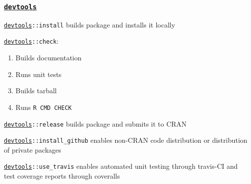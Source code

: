 \documentclass[12 pt]{beamer}\usepackage[]{graphicx}\usepackage[]{color}
\newcommand{\hlkwd}[1]{\textcolor[rgb]{0.78,0.227,0.412}{#1}}%
\newcommand{\mxkwd}[1]{\texttt{\hlkwd{#1}}}%
\newcommand{\pkg}[1]{{\fontseries{b}\selectfont #1}}
\renewcommand{\pkg}[1]{{\color{darkgreen}\texttt{#1}}}
\begin{document}

  \begin{frame}[fragile]
\frametitle{\href{http://cran.r-project.org/web/packages/devtools/index.html}{\pkg{devtools}}}

\href{http://cran.r-project.org/web/packages/devtools/index.html}{\pkg{devtools}}{\tt ::\mxkwd{install}} builds package and installs it locally

\vspace{.1in}

\href{http://cran.r-project.org/web/packages/devtools/index.html}{\pkg{devtools}}{\tt ::\mxkwd{check}}:
\begin{enumerate}
  \item  Builds documentation
  \item Runs unit tests
  \item Builds tarball
  \item Runs {\tt R CMD CHECK}
\end{enumerate}

\vspace{.1in}

\href{http://cran.r-project.org/web/packages/devtools/index.html}{\pkg{devtools}}{\tt ::\mxkwd{release}} builds package and submits it to CRAN

\vspace{.1in}

\href{http://cran.r-project.org/web/packages/devtools/index.html}{\pkg{devtools}}{\tt ::\mxkwd{install\_github}} enables non-CRAN code distribution or distribution of private packages

\vspace{.1in}

\href{http://cran.r-project.org/web/packages/devtools/index.html}{\pkg{devtools}}{\tt ::\mxkwd{use\_travis}} enables automated unit testing through travis-CI and test coverage reports through coveralls

\end{frame}




\end{document}
